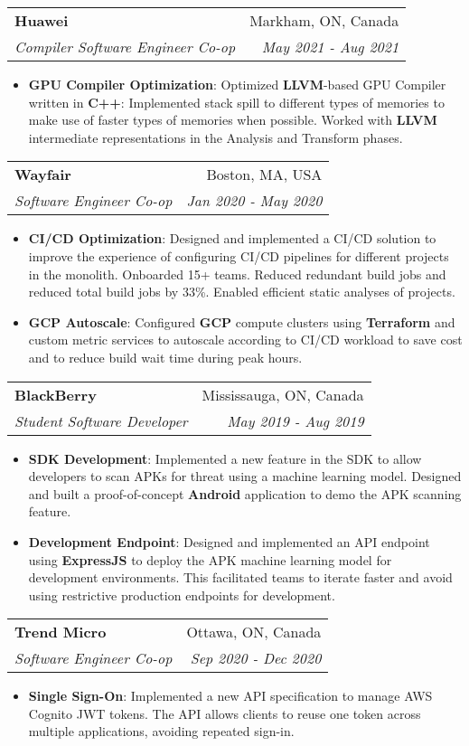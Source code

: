 \documentclass[letterpaper,11pt]{article}
\makeatletter
\newcommand{\resumeItem}[2]{
  \item\small{
    \textbf{#1}{: #2 \vspace{-2pt}}
  }
}
\newcommand{\resumeSubheading}[4]{
  \vspace{-1pt}\item
    \begin{tabular*}{0.97\textwidth}[t]{l@{\extracolsep{\fill}}r}
      \textbf{#1} & #2 \\
      \textit{\small#3} & \textit{\small #4} \\
    \end{tabular*}\vspace{-5pt}
}
\newcommand{\resumeSubSubheading}[2]{
    \begin{tabular*}{0.97\textwidth}{l@{\extracolsep{\fill}}r}
      \textit{\small#1} & \textit{\small #2} \\
    \end{tabular*}\vspace{-5pt}
}
\newcommand{\resumeSubHeadingListEnd}{\end{itemize}}
\newcommand{\resumeItemListStart}{\begin{itemize}}
\newcommand{\resumeItemListEnd}{\end{itemize}\vspace{-5pt}}
\makeatother
\begin{document}

    \resumeSubheading
      {Huawei}{Markham, ON, Canada}
      {Compiler Software Engineer Co-op}{May 2021 - Aug 2021}
      \resumeItemListStart
        \resumeItem{GPU Compiler Optimization}
          {Optimized \textbf{LLVM}-based GPU Compiler written in \textbf{C++}: Implemented stack spill to different types of memories to make use of faster types of memories when possible. 
          Worked with \textbf{LLVM} intermediate representations in the Analysis and Transform phases.}
      \resumeItemListEnd

    \resumeSubheading
      {Wayfair}{Boston, MA, USA}
      {Software Engineer Co-op}{Jan 2020 - May 2020}
      \resumeItemListStart
        \resumeItem{CI/CD Optimization}
          {Designed and implemented a CI/CD solution to improve the experience of configuring CI/CD pipelines for different projects in the monolith. Onboarded 15+ teams.
          Reduced redundant build jobs and reduced total build jobs by 33\%.
          Enabled efficient static analyses of projects. }
        \resumeItem{GCP Autoscale}
        {Configured \textbf{GCP} compute clusters using \textbf{Terraform} and custom metric services to autoscale according to CI/CD workload to save cost and to reduce build wait time during peak hours.}
      \resumeItemListEnd

    \resumeSubheading
      {BlackBerry}{Mississauga, ON, Canada}
      {Student Software Developer}{May 2019 - Aug 2019}
      \resumeItemListStart
        \resumeItem{SDK Development}
          {Implemented a new feature in the SDK to allow developers to scan APKs for threat using a machine learning model.
          Designed and built a proof-of-concept \textbf{Android} application to demo the APK scanning feature. }
        \resumeItem{Development Endpoint}
          {Designed and implemented an API endpoint using \textbf{ExpressJS} to deploy the APK machine learning model for development environments. 
          This facilitated teams to iterate faster and avoid using restrictive production endpoints for development. }
      \resumeItemListEnd

    \resumeSubheading
      {Trend Micro}{Ottawa, ON, Canada}
      {Software Engineer Co-op}{Sep 2020 - Dec 2020}
      \resumeItemListStart
        \resumeItem{Single Sign-On}
          { Implemented a new API specification to manage AWS Cognito JWT tokens. The API allows clients to reuse one token across multiple applications, avoiding repeated sign-in. }
      \resumeItemListEnd
\end{document}

